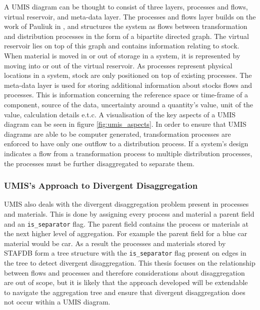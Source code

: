 \documentclass[ %
                    author={Tom Jager},
                supervisor={Dr. Daniel Schien},
                    degree={MEng},
                     title={A Bayesian Inference Engine for Calibrating Uncertainty over UMIS Structured MFA Systems},
                  subtitle={},
                      type={research},
                      year={2019} ]{dissertation}
\begin{document}
A UMIS diagram can be thought to consist of three layers, processes and flows, virtual reservoir, and meta-data layer. The processes and flows layer builds on the work of Pauliuk in \cite{pauliuk2015general}, and structures the system as flows between transformation and distribution processes in the form of a bipartite directed graph. The virtual reservoir lies on top of this graph and contains information relating to stock. When material is moved in or out of storage in a system, it is represented by moving into or out of the virtual reservoir. As processes represent physical locations in a system, stock are only positioned on top of existing processes. The meta-data layer is used for storing additional information about stocks flows and processes. This is information concerning the reference space or time-frame of a component, source of the data, uncertainty around a quantity's value, unit of the value, calculation details e.t.c. A visualisation of the key aspects of a UMIS diagram can be seen in figure \ref{fig:umis_aspects}. In order to ensure that UMIS diagrams are able to be computer generated, transformation processes are enforced to have only one outflow to a distribution process. If a system's design indicates a flow from a transformation process to multiple distribution processes, the processes must be further disaggregated to separate them. 

\subsubsection{UMIS's Approach to Divergent Disaggregation}
UMIS also deals with the divergent disaggregation problem present in processes and materials. This is done by assigning every process and material a parent field and an \texttt{is\_separator} flag. The parent field contains the process or materials at the next higher level of aggregation. For example the parent field for a blue car material would be car. As a result the processes and materials stored by STAFDB form a tree structure with the \texttt{is\_separator} flag present on edges in the tree to detect divergent disaggregation. This thesis focuses on the relationship between flows and processes and therefore considerations about disaggregation are out of scope, but it is likely that the approach developed will be extendable to navigate the aggregation tree and ensure that divergent disaggregation does not occur within a UMIS diagram.
\end{document}
